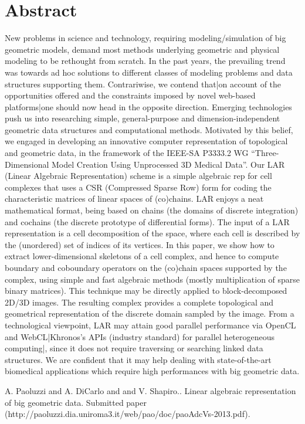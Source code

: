 \documentclass[article,A4,11pt]{llncs}%
\begin{document}
\section*{Abstract}
New problems in science and technology, requiring modeling/simulation of big geometric models, demand most methods underlying geometric and physical modeling to be rethought from scratch. In the past years, the prevailing trend was towards ad hoc solutions to different classes of modeling problems and data structures supporting them. Contrariwise, we contend that|on account of the opportunities offered and the constraints imposed by novel web-based platforms|one should now head in the opposite direction. Emerging technologies push us into researching simple, general-purpose and dimension-independent geometric data structures and computational methods. Motivated by this belief, we engaged in developing an innovative computer representation of topological and geometric data, in the framework of the IEEE-SA P3333.2 WG ``Three-Dimensional Model Creation Using Unprocessed 3D Medical Data''. Our LAR (Linear Algebraic Representation) scheme is a simple algebraic rep for cell complexes that uses a CSR (Compressed Sparse Row) form for coding the characteristic matrices of linear spaces of (co)chains. LAR enjoys a neat mathematical format, being based on chains (the domains of discrete integration) and cochains (the discrete prototype of differential forms). The input of a LAR representation is a cell decomposition of the space, where each cell is described by the (unordered) set of indices of its vertices. In this paper, we show how to extract lower-dimensional skeletons of a cell complex, and hence to compute boundary and coboundary operators on the (co)chain spaces supported by the complex, using simple and fast algebraic methods (mostly multiplication of sparse binary matrices). This technique may be directly applied to block-decomposed 2D/3D images. The resulting complex provides a complete topological and geometrical representation of the discrete domain sampled by the image. From a technological viewpoint, LAR may attain good parallel performance via OpenCL and WebCL|Khronos's APIs (industry standard) for parallel heterogeneous computing|, since it does not require traversing or searching linked data structures. We are confident that it may help dealing with state-of-the-art biomedical applications which require high performances with big geometric data.


\begin{thebibliography}{10}
{\sc A. Paoluzzi and A. DiCarlo and and V. Shapiro.}. {Linear algebraic representation of big geometric data}. Submitted paper (http://paoluzzi.dia.uniroma3.it/web/pao/doc/paoAdcVs-2013.pdf).
\end{thebibliography}
\end{document}
